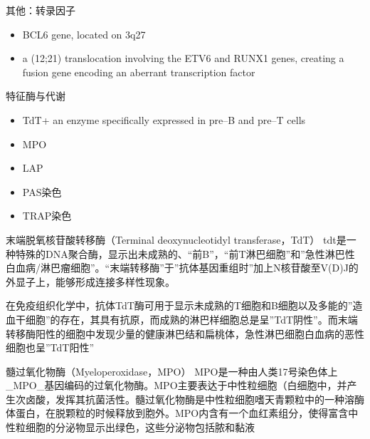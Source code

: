 \documentclass[
  ignorenonframetext,
]{beamer}
\begin{document}
\begin{frame}
\begin{block}{其他：转录因子}
\protect\hypertarget{ux5176ux4ed6ux8f6cux5f55ux56e0ux5b50}{}
\begin{itemize}
\item
  BCL6 gene, located on 3q27
\item
  a (12;21) translocation involving the ETV6 and RUNX1 genes, creating a
  fusion gene encoding an aberrant transcription factor
\end{itemize}
\end{block}
\end{frame}

\begin{frame}
\begin{block}{特征酶与代谢}
\protect\hypertarget{ux7279ux5f81ux9176ux4e0eux4ee3ux8c22}{}
\begin{itemize}
\item
  TdT+ an enzyme specifically expressed in pre--B and pre--T cells
\item
  MPO
\item
  LAP
\item
  PAS染色
\item
  TRAP染色
\end{itemize}
\end{block}
\end{frame}

\begin{frame}
\begin{block}{末端脱氧核苷酸转移酶（Terminal deoxynucleotidyl
transferase，TdT）}
\protect\hypertarget{ux672bux7aefux8131ux6c27ux6838ux82f7ux9178ux8f6cux79fbux9176terminal-deoxynucleotidyl-transferasetdt}{}
tdt是一种特殊的DNA聚合酶，显示出未成熟的、``前B''，``前T淋巴细胞''和''急性淋巴性白血病/淋巴瘤细胞''。``末端转移酶''于''抗体基因重组时''加上N核苷酸至V(D)J的外显子上，能够形成连接多样性现象。

在免疫组织化学中，抗体TdT酶可用于显示未成熟的T细胞和B细胞以及多能的''造血干细胞''的存在，其具有抗原，而成熟的淋巴样细胞总是呈''TdT阴性''。而末端转移酶阳性的细胞中发现少量的健康淋巴结和扁桃体，急性淋巴细胞白血病的恶性细胞也呈''TdT阳性''
\end{block}
\end{frame}

\begin{frame}
\begin{block}{髓过氧化物酶（Myeloperoxidase，MPO）}
\protect\hypertarget{ux9ad3ux8fc7ux6c27ux5316ux7269ux9176myeloperoxidasempo}{}
MPO是一种由人类17号染色体上\_MPO\_基因编码的过氧化物酶。MPO主要表达于中性粒细胞（白细胞中，并产生次卤酸，发挥其抗菌活性。髓过氧化物酶是中性粒细胞嗜天青颗粒中的一种溶酶体蛋白，在脱颗粒的时候释放到胞外。MPO内含有一个血红素组分，使得富含中性粒细胞的分泌物显示出绿色，这些分泌物包括脓和黏液
\end{block}
\end{frame}
\end{document}
